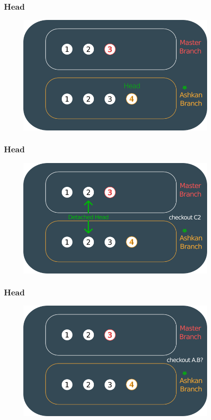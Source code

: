 \documentclass{beamer}
\begin{document}
	\begin{frame}
		\frametitle{Head}
		\begin{figure}[htbp]
			\centering
			\includegraphics[width=10cm]{head9}
		\end{figure}
	\end{frame}
	
	\begin{frame}
		\frametitle{Head}
		\begin{figure}[htbp]
			\centering
			\includegraphics[width=10cm]{head10}
		\end{figure}
	\end{frame}
	
	\begin{frame}
		\frametitle{Head}
		\begin{figure}[htbp]
			\centering
			\includegraphics[width=10cm]{head11}
		\end{figure}
	\end{frame}
	
\end{document}
